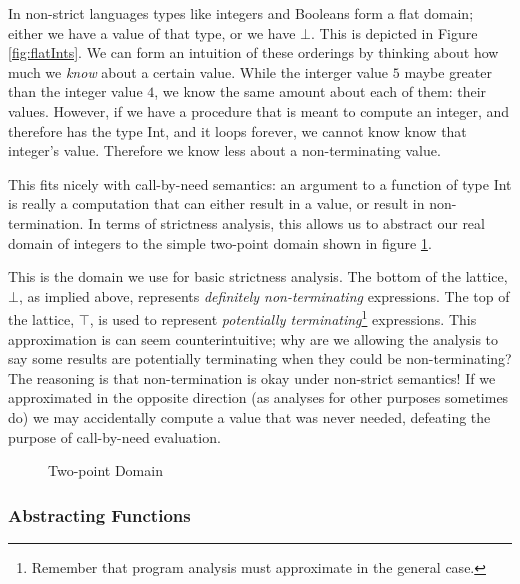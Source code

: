 In non-strict languages types like integers and Booleans form a flat domain;
either we have a value of that type, or we have $\bot$. This is depicted in
Figure \ref{fig:flatInts}. We can form an intuition of these orderings by
thinking about how much we \emph{know} about a certain value. While the
interger value $5$ maybe greater than the integer value $4$, we know the
same amount about each of them: their values. However, if we have a procedure
that is meant to compute an integer, and therefore has the type \<Int\>, and it
loops forever, we cannot know know that integer's value. Therefore we know less
about a non-terminating value.


This fits nicely with call-by-need semantics: an argument to a function of
type \<Int\> is really a computation that can either result in a value, or
result in non-termination. In terms of strictness analysis, this allows us to
abstract our real domain of integers to the simple two-point domain shown in
figure \ref{fig:twoPointNice}.

This is the domain we use for basic strictness analysis. The bottom of the
lattice, $\bot$, as implied above, represents \emph{definitely non-terminating}
expressions. The top of the lattice, $\top$, is used to represent
\emph{potentially terminating}\footnote{Remember that program analysis must
approximate in the general case.} expressions. This approximation is can seem
counterintuitive; why are we allowing the analysis to say some results are
potentially terminating when they could be non-terminating? The reasoning is
that non-termination is okay under non-strict semantics! If we approximated in
the opposite direction (as analyses for other purposes sometimes do) we may
accidentally compute a value that was never needed, defeating the purpose of
call-by-need evaluation.


\begin{figure}
\centering
{}
\caption{Two-point Domain}
\label{fig:twoPointNice}
\end{figure}

\subsubsection{Abstracting Functions}

